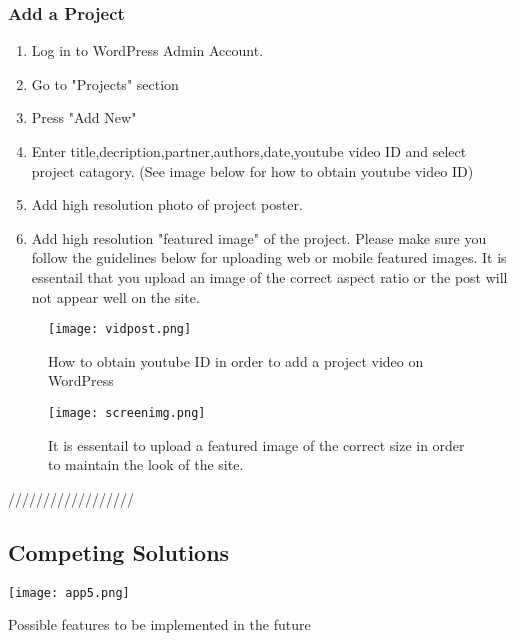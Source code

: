 \subsubsection{Add a Project}
\begin{enumerate}

  \item Log in to WordPress Admin Account.
  \item Go to "Projects" section
  \item Press "Add New"
  \item Enter title,decription,partner,authors,date,youtube video ID and select project catagory. (See image below for how to obtain youtube video ID)
  \item Add high resolution photo of project poster.
  \item Add high resolution "featured image" of the project. Please make sure you follow the guidelines below for uploading web or mobile featured images. It is essentail that you upload an image of the correct aspect ratio or the post will not appear well on the site. 

\end{enumerate}

 \begin{figure}[H]
      \centering
      \texttt{[image: vidpost.png]}
      \caption{How to obtain youtube ID in order to add a project video on WordPress}
 \end{figure}

  \begin{figure}[H]
      \centering
      \texttt{[image: screenimg.png]}
      \caption{It is essentail to upload a featured image of the correct size in order to maintain the look of the site.}
 \end{figure}

//////////////////

\begin{landscape}
\subsection{Competing Solutions}
  \begin{table}[H]
      \centering
      \texttt{[image: app5.png]}
      \caption{Possible features to be implemented in the future}
 \end{table}
 \end{landscape}

